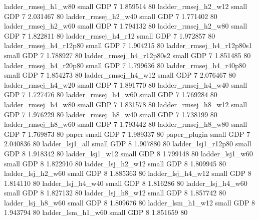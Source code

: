      ladder_rmsej_h1_w80      small      GDP                 7 1.859514 80
     ladder_rmsej_h2_w12      small      GDP                 7 2.031467 80
     ladder_rmsej_h2_w40      small      GDP                 7 1.771402 80
     ladder_rmsej_h2_w60      small      GDP                 7 1.794132 80
     ladder_rmsej_h2_w80      small      GDP                 7 1.822811 80
     ladder_rmsej_h4_r12      small      GDP                 7 1.972857 80
  ladder_rmsej_h4_r12p80      small      GDP                 7 1.904215 80
ladder_rmsej_h4_r12p80s1      small      GDP                 7 1.788927 80
ladder_rmsej_h4_r12p80s2      small      GDP                 7 1.851485 80
  ladder_rmsej_h4_r20p80      small      GDP                 7 1.799636 80
  ladder_rmsej_h4_r40p80      small      GDP                 7 1.854273 80
     ladder_rmsej_h4_w12      small      GDP                 7 2.076467 80
     ladder_rmsej_h4_w20      small      GDP                 7 1.891770 80
     ladder_rmsej_h4_w40      small      GDP                 7 1.727476 80
     ladder_rmsej_h4_w60      small      GDP                 7 1.769284 80
     ladder_rmsej_h4_w80      small      GDP                 7 1.831578 80
     ladder_rmsej_h8_w12      small      GDP                 7 1.976229 80
     ladder_rmsej_h8_w40      small      GDP                 7 1.738199 80
     ladder_rmsej_h8_w60      small      GDP                 7 1.793442 80
     ladder_rmsej_h8_w80      small      GDP                 7 1.769873 80
                   paper      small      GDP                 7 1.989337 80
            paper_plugin      small      GDP                 7 2.040836 80
         ladder_lsj1_all      small      GDP                 8 1.907880 80
      ladder_lsj1_r12p80      small      GDP                 8 1.918342 80
         ladder_lsj1_w12      small      GDP                 8 1.799148 80
         ladder_lsj1_w60      small      GDP                 8 1.822910 80
       ladder_lsj_h2_w12      small      GDP                 8 1.809945 80
       ladder_lsj_h2_w60      small      GDP                 8 1.885363 80
       ladder_lsj_h4_w12      small      GDP                 8 1.814110 80
       ladder_lsj_h4_w40      small      GDP                 8 1.816286 80
       ladder_lsj_h4_w60      small      GDP                 8 1.827132 80
       ladder_lsj_h8_w12      small      GDP                 8 1.857742 80
       ladder_lsj_h8_w60      small      GDP                 8 1.809676 80
       ladder_lsm_h1_w12      small      GDP                 8 1.943794 80
       ladder_lsm_h1_w60      small      GDP                 8 1.851659 80
